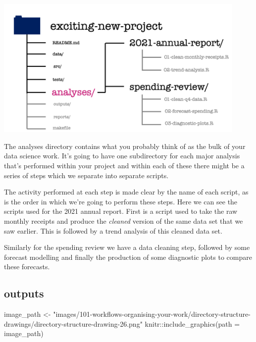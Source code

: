 \documentclass[
  letterpaper,
  DIV=11,
  numbers=noendperiod]{scrreprt}
\newenvironment{Shaded}{\begin{snugshade}}{\end{snugshade}}
\newcommand{\AttributeTok}[1]{\textcolor[rgb]{0.40,0.45,0.13}{#1}}
\newcommand{\FunctionTok}[1]{\textcolor[rgb]{0.28,0.35,0.67}{#1}}
\newcommand{\NormalTok}[1]{\textcolor[rgb]{0.00,0.23,0.31}{#1}}
\newcommand{\OtherTok}[1]{\textcolor[rgb]{0.00,0.23,0.31}{#1}}
\newcommand{\SpecialCharTok}[1]{\textcolor[rgb]{0.37,0.37,0.37}{#1}}
\newcommand{\StringTok}[1]{\textcolor[rgb]{0.13,0.47,0.30}{#1}}
\begin{document}
\includegraphics[width=4.8in,height=\textheight]{images/101-workflows-organising-your-work/directory-structure-drawings/directory-structure-drawing-23.png}

The analyses directory contains what you probably think of as the bulk
of your data science work. It's going to have one subdirectory for each
major analysis that's performed within your project and within each of
these there might be a series of steps which we separate into separate
scripts.

The activity performed at each step is made clear by the name of each
script, as is the order in which we're going to perform these steps.
Here we can see the scripts used for the 2021 annual report. First is a
script used to take the raw monthly receipts and produce the
\emph{cleaned} version of the same data set that we saw earlier. This is
followed by a trend analysis of this cleaned data set.

Similarly for the spending review we have a data cleaning step, followed
by some forecast modelling and finally the production of some diagnostic
plots to compare these forecasts.

\subsection{outputs}\label{outputs}

\begin{Shaded}
\begin{Highlighting}[]
\NormalTok{image\_path }\OtherTok{\textless{}{-}} \StringTok{"images/101{-}workflows{-}organising{-}your{-}work/directory{-}structure{-}drawings/directory{-}structure{-}drawing{-}26.png"}
\NormalTok{knitr}\SpecialCharTok{::}\FunctionTok{include\_graphics}\NormalTok{(}\AttributeTok{path =}\NormalTok{ image\_path)}
\end{Highlighting}
\end{Shaded}
\end{document}

